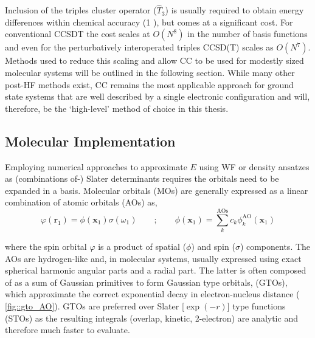 \documentclass[main.tex]{subfiles}
\begin{document}

Inclusion of the triples cluster operator ($\hat{T}_3$) is usually required to obtain energy differences within chemical accuracy (1 \kcal),\cite{Deustua2021} but comes at a significant cost. For conventional CCSDT the cost scales at $O(N^8)$ in the number of basis functions and even for the perturbatively interoperated triples CCSD(T) scales as $O(N^7)$. Methods used to reduce this scaling and allow CC to be used for modestly sized molecular systems will be outlined in the following section. While many other post-HF methods exist,\cite{SzaboOstlund} CC remains the most applicable approach for ground state systems that are well described by a single electronic configuration and will, therefore, be the `high-level' method of choice in this thesis.  


\subsection{Molecular Implementation}

Employing numerical approaches to approximate $E$ using WF or density ansatzes as (combinations of-) Slater determinants requires the orbitals need to be expanded in a basis. Molecular orbitals (MOs) are generally expressed as a linear combination of atomic orbitals (AOs) as,
\begin{equation}
	\varphi(\boldsymbol{r}_1) = \phi(\boldsymbol{x}_1)\sigma(\omega_1) \qquad ; \qquad \phi(\boldsymbol{x}_1) = \sum_{k}^\text{AOs} c_k\phi_k^\text{AO}(\boldsymbol{x}_1)
\end{equation}

where the spin orbital $\varphi$ is a product of spatial ($\phi$) and spin ($\sigma$) components. The AOs are hydrogen-like and, in molecular systems, usually expressed using exact spherical harmonic angular parts and a radial part. The latter is often composed of as a sum of Gaussian primitives to form Gaussian type orbitals, (GTOs), which approximate the correct exponential decay in electron-nucleus distance (\figurename{ \ref{fig::gto_AO}}). GTOs are preferred over Slater [$\exp(-r)$] type functions (STOs) as the resulting integrals (overlap, kinetic, 2-electron) are analytic and therefore much faster to evaluate. 
\end{document}

